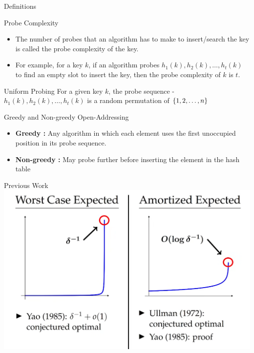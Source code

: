 \documentclass{beamer}
\begin{document}
\begin{frame} {Definitions}
	\begin{block}{Probe Complexity}
		\begin{itemize}
			\item The number of probes that an algorithm has to make to insert/search the key is called the probe complexity of the key.
			\item For example, for a key $k$, if an algorithm probes $h_1(k), h_2(k), \ldots, h_t(k)$ to find an empty slot to insert the key, then the probe complexity of $k$ is $t$.
		\end{itemize}
	\end{block}

\begin{block}{Uniform Probing}
	For a given key $k$, the probe sequence - $h_1(k), h_2(k), \ldots, h_t(k)$ is a random permutation of $\left\{ 1, 2, \ldots,n  \right\}$
\end{block}
\end{frame}


\begin{frame}{Greedy and Non-greedy Open-Addressing}
	\begin{itemize}
		\item {\bf Greedy :}  Any algorithm in which each element uses the first unoccupied position in its probe sequence.
		\item {\bf Non-greedy :} May probe further before inserting the element in the hash table
	\end{itemize}	
\end{frame}

\begin{frame}{Previous Work}
	\includegraphics[scale=0.35]{previous-work}
\end{frame}
\end{document}
